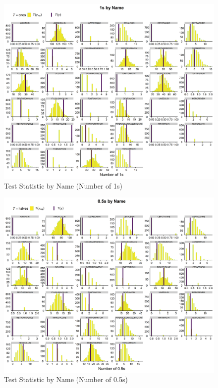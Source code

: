 \documentclass[11pt,twoside]{article}
\numberwithin{Theorem}{section}
\numberwithin{Definition}{section}
\numberwithin{Lemma}{section}
\numberwithin{Algorithm}{section}
\numberwithin{equation}{section}
\begin{document}
\begin{figure}[h!]
	\centering
	\includegraphics[width = 1\textwidth, height=0.45\textheight]{Figures/4_MC41_Ones.png}
	\caption{Test Statistic by Name (Number of 1s)} \label{fig::4_MC41_Ones}	
\end{figure}


\begin{figure}[h!]
	\centering
	\includegraphics[width = 1\textwidth, height=0.45\textheight]{Figures/4_MC41_Halves.png}
	\caption{Test Statistic by Name (Number of 0.5s)} \label{fig::4_MC41_Halves}	
\end{figure}
\end{document}
